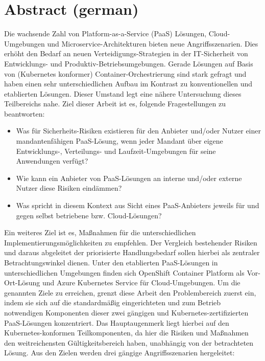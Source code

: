 \chapter*{Abstract (german)}
\thispagestyle{empty}
Die wachsende Zahl von Platform-as-a-Service (PaaS) Lösungen, Cloud-Umgebungen und Microservice-Architekturen bieten neue Angriffsszenarien.
Dies erhöht den Bedarf an neuen Verteidigungs-Strategien in der IT-Sicherheit von Entwicklungs- und Produktiv-Betriebsumgebungen.
Gerade Lösungen auf Basis von (Kubernetes konformer) Container-Orchestrierung sind stark gefragt und haben einen sehr unterschiedlichen Aufbau im Kontrast zu konventionellen und etablierten Lösungen.
Dieser Umstand legt eine nähere Untersuchung dieses Teilbereichs nahe.
Ziel dieser Arbeit ist es, folgende Fragestellungen zu beantworten:

\begin{itemize}

\item Was für Sicherheits-Risiken existieren für den Anbieter und/oder Nutzer einer mandantenfähigen PaaS-Lösung, wenn jeder Mandant über eigene Entwicklungs-, Verteilungs- und Laufzeit-Umgebungen für seine Anwendungen verfügt?

\item Wie kann ein Anbieter von PaaS-Lösungen an interne und/oder externe Nutzer diese Risiken eindämmen?

\item Was spricht in diesem Kontext aus Sicht eines PaaS-Anbieters jeweils für und gegen selbst betriebene bzw. Cloud-Lösungen?

\end{itemize}

Ein weiteres Ziel ist es, Maßnahmen für die unterschiedlichen Implementierungsmöglichkeiten zu empfehlen.
Der Vergleich bestehender Risiken und daraus abgeleitet der priorisierte Handlungsbedarf sollen hierbei als zentraler Betrachtungswinkel dienen.
Unter den etablierten PaaS-Lösungen in unterschiedlichen Umgebungen finden sich OpenShift Container Platform als Vor-Ort-Lösung und Azure Kubernetes Service für Cloud-Umgebungen.
Um die genannten Ziele zu erreichen, grenzt diese Arbeit den Problembereich zuerst ein, indem sie sich auf die standardmäßig eingerichteten und zum Betrieb notwendigen Komponenten dieser zwei gängigen und Kubernetes-zertifizierten PaaS-Lösungen konzentriert.
Das Hauptaugenmerk liegt hierbei auf den Kubernetes-konformen Teilkomponenten, da hier die Risiken und Maßnahmen den weitreichensten Gültigkeitsbereich haben, unabhängig von der betrachteten Lösung.
Aus den Zielen werden drei gängige Angriffsszenarien hergeleitet: 

